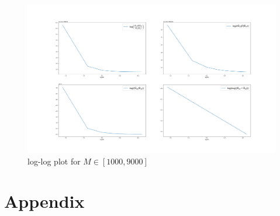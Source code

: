 \documentclass[11pt, letterpaper, onecolumn]{article}
\begin{document}
\begin{figure}[!h]
    \centering
    \includegraphics[width=.9\textwidth]{plots_for_1000M9000.png}
    \caption{log-log plot for $M\in[1000, 9000]$ }
\end{figure}\noindent\newline





\section{Appendix} \label{sec:appendix}
\end{document}
